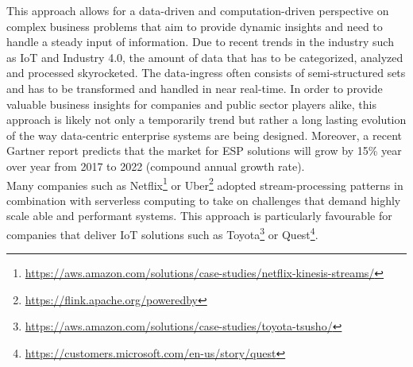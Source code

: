 This approach allows for a data-driven and computation-driven perspective on complex business problems that aim to provide dynamic insights and need to handle a steady input of information. 
Due to recent trends in the industry such as IoT and Industry 4.0, the amount of data that has to be categorized, analyzed and processed skyrocketed. The data-ingress often consists of semi-structured sets and has to be transformed and handled in near real-time.\autocite{Dekate2017PredictsInfrastructure} In order to provide valuable business insights for companies and public sector players alike, this approach is likely not only a temporarily trend but rather a long lasting evolution of the way data-centric enterprise systems are being designed. Moreover, a recent Gartner report predicts that the market for \acf{ESP} solutions will grow by 15\% year over year from 2017 to 2022 (compound annual growth rate).\autocite{Heudecker2017MarketProcessing} \\
Many companies such as Netflix\footnote{\url{https://aws.amazon.com/solutions/case-studies/netflix-kinesis-streams/}} or Uber\footnote{\url{https://flink.apache.org/poweredby}} adopted stream-processing patterns in combination with serverless computing to take on challenges that demand highly scale able and performant systems. 
This approach is particularly favourable for companies that deliver IoT solutions such as Toyota\footnote{\url{https://aws.amazon.com/solutions/case-studies/toyota-tsusho/}} or Quest\footnote{\url{https://customers.microsoft.com/en-us/story/quest}}.

